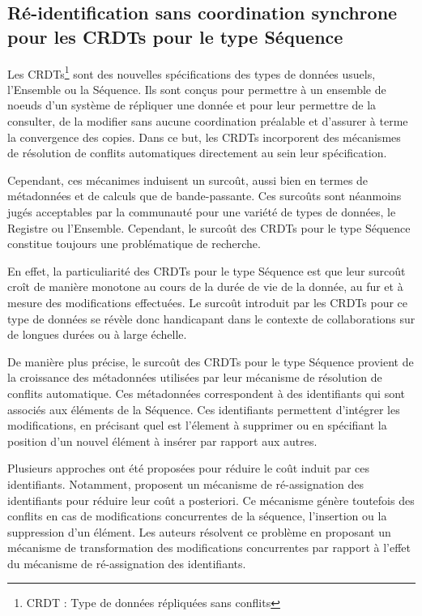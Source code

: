 \subsection{Ré-identification sans coordination synchrone pour les \acp{CRDT} pour le type Séquence}
\label{sec:research-questions-rls}

Les \acfp{CRDT}\footnote{\acf{CRDT} : Type de données répliquées sans conflits} \cite{2007-crdt-shapiro,shapiro_2011_crdt} sont des nouvelles spécifications des types de données usuels, \eg l'Ensemble ou la Séquence.
Ils sont conçus pour permettre à un ensemble de noeuds d'un système de répliquer une donnée et pour leur permettre de la consulter, de la modifier sans aucune coordination préalable et d'assurer à terme la convergence des copies.
Dans ce but, les \acp{CRDT} incorporent des mécanismes de résolution de conflits automatiques directement au sein leur spécification.

Cependant, ces mécanimes induisent un surcoût, aussi bien en termes de métadonnées et de calculs que de bande-passante.
Ces surcoûts sont néanmoins jugés acceptables par la communauté pour une variété de types de données, \eg le Registre ou l'Ensemble.
Cependant, le surcoût des \acp{CRDT} pour le type Séquence constitue toujours une problématique de recherche.

En effet, la particuliarité des \acp{CRDT} pour le type Séquence est que leur surcoût croît de manière monotone au cours de la durée de vie de la donnée, \ie au fur et à mesure des modifications effectuées.
Le surcoût introduit par les \acp{CRDT} pour ce type de données se révèle donc handicapant dans le contexte de collaborations sur de longues durées ou à large échelle.

De manière plus précise, le surcoût des \acp{CRDT} pour le type Séquence provient de la croissance des métadonnées utilisées par leur mécanisme de résolution de conflits automatique.
Ces métadonnées correspondent à des identifiants qui sont associés aux éléments de la Séquence.
Ces identifiants permettent d'intégrer les modifications, \eg en précisant quel est l'élement à supprimer ou en spécifiant la position d'un nouvel élément à insérer par rapport aux autres.

Plusieurs approches ont été proposées pour réduire le coût induit par ces identifiants.
Notamment, \cite{letia:hal-01248270,zawirski:hal-01248197} proposent un mécanisme de ré-assignation des identifiants pour réduire leur coût a posteriori.
Ce mécanisme génère toutefois des conflits en cas de modifications concurrentes de la séquence, \ie l'insertion ou la suppression d'un élément.
Les auteurs résolvent ce problème en proposant un mécanisme de transformation des modifications concurrentes par rapport à l'effet du mécanisme de ré-assignation des identifiants.

